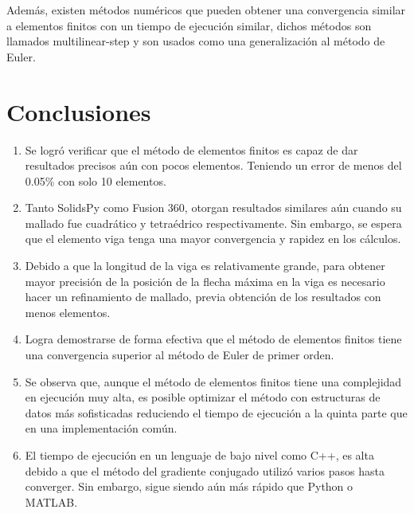 \documentclass[11pt,a4paper]{article}
\begin{document}
\begin{table}[H]
    \centering
    \caption{Comparación entre Elementos finitos y Diferencias finitas}
\end{table}
Además, existen métodos numéricos \cite{fast_algorithms} que pueden obtener una convergencia similar a elementos finitos con un tiempo de ejecución similar, dichos métodos son llamados multilinear-step y son usados como una generalización al método de Euler. 

\section*{Conclusiones}
\begin{enumerate}
    \item Se logró verificar que el método de elementos finitos es capaz de dar resultados precisos aún con pocos elementos. Teniendo un error de menos del 0.05\% con solo 10 elementos.
    \item Tanto SolidsPy como Fusion 360, otorgan resultados similares aún cuando su mallado fue cuadrático y tetraédrico respectivamente. Sin embargo, se espera que el elemento viga tenga una mayor convergencia y rapidez en los cálculos.
    \item Debido a que la longitud de la viga es relativamente grande, para obtener mayor precisión de la posición de la flecha máxima en la viga es necesario hacer un refinamiento de mallado, previa obtención de los resultados con menos elementos.
    \item Logra demostrarse de forma efectiva que el método de elementos finitos tiene una convergencia superior al método de Euler de primer orden.
    \item Se observa que, aunque el método de elementos finitos tiene una complejidad en ejecución muy alta, es posible optimizar el método con estructuras de datos más sofisticadas \cite{sparse_code} reduciendo el tiempo de ejecución a la quinta parte que en una implementación común.
    \item El tiempo de ejecución en un lenguaje de bajo nivel como C++, es alta debido a que el método del gradiente conjugado utilizó varios pasos hasta converger. Sin embargo, sigue siendo aún más rápido que Python o MATLAB.
\end{enumerate}




\end{document}
